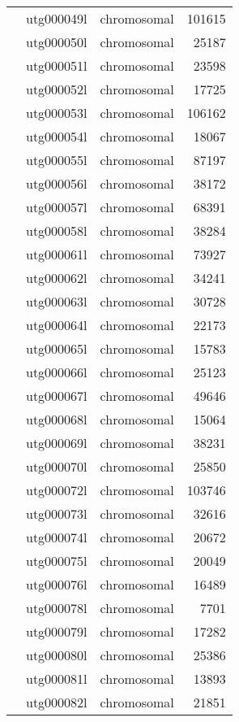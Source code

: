 {\begin{supertabular}{llcr}
          & utg000049l & chromosomal & 101615 \\
          & utg000050l & chromosomal & 25187 \\
          & utg000051l & chromosomal & 23598 \\
          & utg000052l & chromosomal & 17725 \\
          & utg000053l & chromosomal & 106162 \\
          & utg000054l & chromosomal & 18067 \\
          & utg000055l & chromosomal & 87197 \\
          & utg000056l & chromosomal & 38172 \\
          & utg000057l & chromosomal & 68391 \\
          & utg000058l & chromosomal & 38284 \\
          & utg000061l & chromosomal & 73927 \\
          & utg000062l & chromosomal & 34241 \\
          & utg000063l & chromosomal & 30728 \\
          & utg000064l & chromosomal & 22173 \\
          & utg000065l & chromosomal & 15783 \\
          & utg000066l & chromosomal & 25123 \\
          & utg000067l & chromosomal & 49646 \\
          & utg000068l & chromosomal & 15064 \\
          & utg000069l & chromosomal & 38231 \\
          & utg000070l & chromosomal & 25850 \\
          & utg000072l & chromosomal & 103746 \\
          & utg000073l & chromosomal & 32616 \\
          & utg000074l & chromosomal & 20672 \\
          & utg000075l & chromosomal & 20049 \\
          & utg000076l & chromosomal & 16489 \\
          & utg000078l & chromosomal & 7701 \\
          & utg000079l & chromosomal & 17282 \\
          & utg000080l & chromosomal & 25386 \\
          & utg000081l & chromosomal & 13893 \\
          & utg000082l & chromosomal & 21851 \\

\end{supertabular}}
